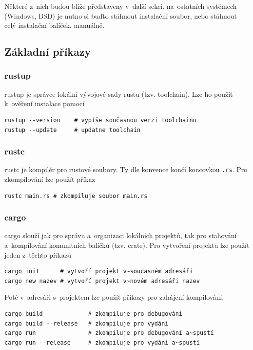 \documentclass[a4paper, 12pt]{article} %
\begin{document}
        Některé z~nich budou blíže představeny v~další sekci.
        na~ostatních systémech (Windows, BSD) je nutno si buďto stáhnout instalační soubor, nebo stáhnout celý instalační balíček. manuálně\cite{rustdl}.

        \subsection{Základní příkazy}
            \subsubsection*{rustup}
                rustup je správce lokální vývojové sady rustu (tzv. toolchain). Lze ho použít k~ověření instalace pomocí
                \begin{verbatim}
rustup --version    # vypíše současnou verzi toolchainu
rustup --update     # updatne toolchain
                \end{verbatim}

            \subsubsection*{rustc}
                rustc je kompilér pro rustové soubory. Ty dle konvence končí koncovkou \texttt{.rs}. Pro zkompilování lze použít příkaz
                \begin{verbatim}
rustc main.rs # zkompiluje soubor main.rs
                \end{verbatim}
    
            \subsubsection*{cargo}
                cargo slouží jak pro správu a~organizaci lokálních projektů, tak pro stahování a~kompilování komunitních balíčků (tzv. crate). Pro vytvoření projektu lze použít jeden z~těchto příkazů
                \begin{verbatim}
cargo init      # vytvoří projekt v~současném adresáři
cargo new nazev # vytvoří projekt v~novém adresáři nazev  
                    \end{verbatim}
    
                Poté v~adresáři s~projektem lze použít příkazy pro zahájení kompilování.
                \begin{verbatim}
cargo build             # zkompiluje pro debugování
cargo build --release   # zkompiluje pro vydání
cargo run               # zkompiluje pro debugování a~spustí
cargo run --release     # zkompiluje pro vydání a~spustí
                \end{verbatim}
    
\end{document}
